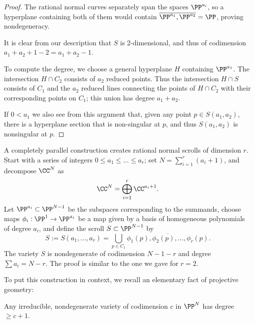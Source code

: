 \begin{proof}
 The rational normal curves separately span the spaces $\PP^{a_i}$, so a hyperplane containing both of them would contain $\overline{\PP^{a_1}, \PP^{a_{2}}} = \PP$, proving nondegeneracy. 
 
 It is clear from our description that $S$ is 2-dimensional, and thus of
codimension $a_{1}+a_{2}+1 -2 = a_{1}+a_{2}-1$. 

To compute the degree, we choose a general hyperplane $H$ containing $\PP^{a_{1}}$. The intersection $H\cap C_{2}$ consists of $a_{2}$ reduced points. Thus the intersection $H\cap S$ consists of $C_{1}$ and the $a_{2}$ reduced lines connecting 
the points of $H\cap C_{2}$ with their corresponding points on $C_{1}$; this union has degree $a_{1}+a_{2}$.

If $0< a_{1}$ we also see from this argument that, given any point  $p\in S(a_{1},a_{2})$, there is
a hyperplane section that is non-singular at $p$, and thus $S(a_{1},a_{2})$ is nonsingular at $p$.
\end{proof}

A completely parallel construction creates rational normal scrolls of dimension $r$. Start with a series of integers $0 \leq a_1 \leq \dots \leq a_r$;
set $N = \sum_{i=1}^{r}(a_{i}+1)$,  and
decompose $\CC^{N}$ as
$$
\CC^{N} = \bigoplus_{i=1}^{r}\CC^{a_{i}+1}.
$$
Let $\PP^{a_{i}}\subset \PP^{N-1}$ be the subspaces corresponding to the summands,  choose
maps $\phi_i : \PP^1 \to \PP^{a_{i}}$ be a map given by a basis of homogeneous polynomials of degree $a_i$, and define the scroll $S \subset \PP^{N-1}$ by
$$
S:=S(a_{1}, \dots, a_{r}) = \bigcup_{p\in C_{1}}\overline{\phi_1(p), \phi_{2}(p), \dots, \phi_{r}(p)}.
$$
The variety $S$ is nondegenerate of codimension $N-1-r$ and degree $\sum a_{i} = N-r$. The proof is similar to the one we gave for $r=2$.


To put this construction in context, we recall an elementary fact of projective geometry:
 
\begin{proposition}\label{minimal degree}
 Any irreducible, nondegenerate variety of codimension $c$ in $\PP^{N}$ has degree $\geq c +1$.
\end{proposition}

